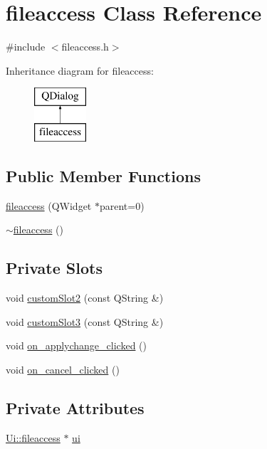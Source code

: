 \hypertarget{classfileaccess}{\section{fileaccess Class Reference}
\label{classfileaccess}
}


{\ttfamily \#include $<$fileaccess.\-h$>$}

Inheritance diagram for fileaccess\-:\begin{figure}[H]
\begin{center}
\leavevmode
\includegraphics[height=2.000000cm]{classfileaccess}
\end{center}
\end{figure}
\subsection*{Public Member Functions}
\begin{DoxyCompactItemize}
\item 
\hyperlink{classfileaccess_ac9c2389d436c1e8bbf9fdcb65bb61ea5}{fileaccess} (Q\-Widget $\ast$parent=0)
\item 
\hyperlink{classfileaccess_ad77c12d8e775b1cca18761003f6396c0}{$\sim$fileaccess} ()
\end{DoxyCompactItemize}
\subsection*{Private Slots}
\begin{DoxyCompactItemize}
\item 
void \hyperlink{classfileaccess_a2bd3fbf812fe0f693472a4cab995ef08}{custom\-Slot2} (const Q\-String \&)
\item 
void \hyperlink{classfileaccess_a5fb0863a14068fcc9f2b2aca7aa90fc3}{custom\-Slot3} (const Q\-String \&)
\item 
void \hyperlink{classfileaccess_afd236c90c0bde689019c89c541706f9a}{on\-\_\-applychange\-\_\-clicked} ()
\item 
void \hyperlink{classfileaccess_ad73913970ec921bf71bb3b56050bf719}{on\-\_\-cancel\-\_\-clicked} ()
\end{DoxyCompactItemize}
\subsection*{Private Attributes}
\begin{DoxyCompactItemize}
\item 
\hyperlink{classUi_1_1fileaccess}{Ui\-::fileaccess} $\ast$ \hyperlink{classfileaccess_a78d4b4d5a5e9bd4eb551a59b067892fa}{ui}
\end{DoxyCompactItemize}


